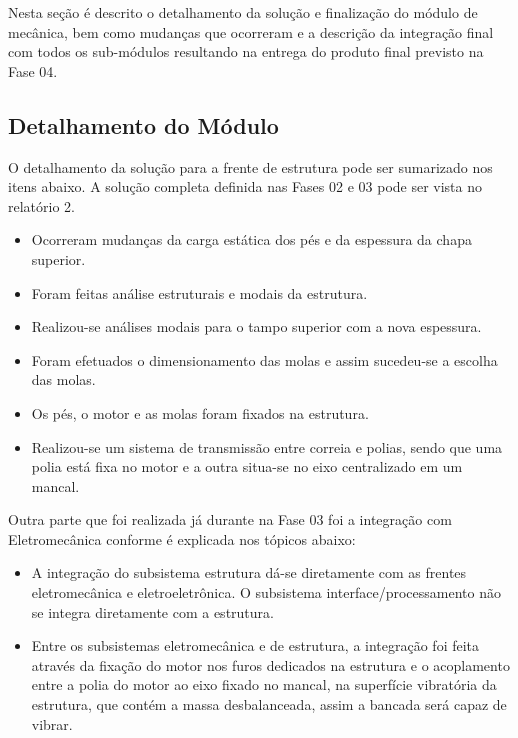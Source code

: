 \label{desenvolvimento_estrutura}

Nesta seção é descrito o detalhamento da solução e finalização do módulo de mecânica, bem como mudanças que ocorreram e a descrição da integração final com todos os sub-módulos resultando na entrega do produto final previsto na Fase 04.

\subsection{Detalhamento do Módulo}

  O detalhamento da solução para a frente de estrutura pode ser sumarizado nos itens abaixo. A solução completa definida nas Fases 02 e 03 pode ser vista no relatório 2.

    \begin{itemize}
    \item Ocorreram mudanças da carga estática dos pés e da espessura da chapa superior.
    \item Foram feitas análise estruturais e modais da estrutura.
    \item Realizou-se análises modais para o tampo superior com a nova espessura.
    \item Foram efetuados o dimensionamento das molas e assim sucedeu-se a escolha das molas.
    \item Os pés, o motor e as molas foram fixados na estrutura.
    \item Realizou-se um sistema de transmissão entre correia e polias, sendo que uma polia está fixa no motor e a outra situa-se no eixo centralizado em um mancal.
    \end{itemize}

  Outra parte que foi realizada já durante na Fase 03 foi a integração com Eletromecânica conforme é explicada nos tópicos abaixo:

  \begin{itemize}
    \item A integração do subsistema estrutura dá-se diretamente com as frentes eletromecânica e eletroeletrônica. O subsistema interface/processamento não se integra diretamente com a estrutura.
    \item Entre os subsistemas eletromecânica e de estrutura, a integração foi feita através da fixação do motor nos furos dedicados na estrutura e o acoplamento entre a polia do motor ao eixo fixado no mancal, na superfície vibratória da estrutura, que contém a massa desbalanceada, assim a bancada será capaz de vibrar.
  \end{itemize}

